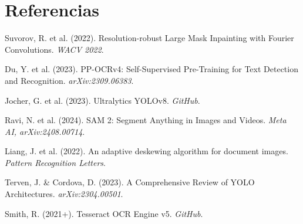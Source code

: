 \documentclass[11pt, a4paper]{article}
\begin{document}
\section*{Referencias}
\small
\begin{enumerate}[leftmargin=1.5em, label={[\arabic*]}]
    \item Suvorov, R. et al. (2022). Resolution-robust Large Mask Inpainting with Fourier Convolutions. \textit{WACV 2022}.
    \item Du, Y. et al. (2023). PP-OCRv4: Self-Supervised Pre-Training for Text Detection and Recognition. \textit{arXiv:2309.06383}.
    \item Jocher, G. et al. (2023). Ultralytics YOLOv8. \textit{GitHub}.
    \item Ravi, N. et al. (2024). SAM 2: Segment Anything in Images and Videos. \textit{Meta AI, arXiv:2408.00714}.
    \item Liang, J. et al. (2022). An adaptive deskewing algorithm for document images. \textit{Pattern Recognition Letters}.
    \item Terven, J. \& Cordova, D. (2023). A Comprehensive Review of YOLO Architectures. \textit{arXiv:2304.00501}.
    \item Smith, R. (2021+). Tesseract OCR Engine v5. \textit{GitHub}.
\end{enumerate}
\end{document}
